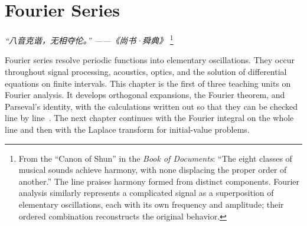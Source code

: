 \chapter{Fourier Series}
\renewcommand{\currentchapterpath}{chapters/fs/}

\begin{flushright}
\textit{“八音克谐，无相夺伦。” ——《尚书·舜典》}
\footnote{From the ``Canon of Shun'' in the \textit{Book of Documents}: ``The eight classes of musical sounds achieve harmony, with none displacing the proper order of another.'' The line praises harmony formed from distinct components. Fourier analysis similarly represents a complicated signal as a superposition of elementary oscillations, each with its own frequency and amplitude; their ordered combination reconstructs the original behavior.}
\end{flushright}

Fourier series resolve periodic functions into elementary oscillations. They occur throughout signal processing, acoustics, optics, and the solution of differential equations on finite intervals. This chapter is the first of three teaching units on Fourier analysis. It develops orthogonal expansions, the Fourier theorem, and Parseval's identity, with the calculations written out so that they can be checked line by line~\cite{fourier,bracewell,lighthill}. The next chapter continues with the Fourier integral on the whole line and then with the Laplace transform for initial-value problems.

